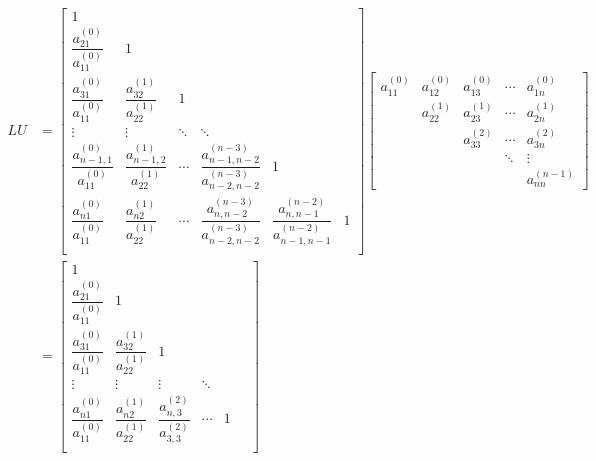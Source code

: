 \documentclass[UTF8,a4paper,10pt]{ctexart}
\begin{document}
                    \begin{align*}
                        LU&=
                        \begin{bmatrix}
                            1 & \  & \  & \  & \  & \  \\
                            \dfrac{a_{21}^{(0)}}{a_{11}^{(0)}} & 1 & \  & \  & \  & \  \\
                            \dfrac{a_{31}^{(0)}}{a_{11}^{(0)}} & \dfrac{a_{32}^{(1)}}{a_{22}^{(1)}} & 1 & \  & \  & \  \\
                            \vdots & \vdots & \ddots  & \ddots & \ \\
                            \dfrac{a_{n-1,1}^{(0)}}{a_{11}^{(0)}} & \dfrac{a_{n-1,2}^{(1)}}{a_{22}^{(1)}} & \cdots & \dfrac{a_{n-1,n-2}^{(n-3)}}{a_{n-2,n-2}^{(n-3)}} & 1 \\
                            \dfrac{a_{n1}^{(0)}}{a_{11}^{(0)}} & \dfrac{a_{n2}^{(1)}}{a_{22}^{(1)}} & \cdots & \dfrac{a_{n,n-2}^{(n-3)}}{a_{n-2,n-2}^{(n-3)}} & \dfrac{a_{n,n-1}^{(n-2)}}{a_{n-1,n-1}^{(n-2)}} & 1 \\
                        \end{bmatrix}
                        \begin{bmatrix}
                            a_{11}^{(0)} & a_{12}^{(0)} & a_{13}^{(0)} & \cdots & a_{1n}^{(0)} \\
                            \ & a_{22}^{(1)} & a_{23}^{(1)} & \cdots & a_{2n}^{(1)} \\
                            \ & \ & a_{33}^{(2)} & \cdots & a_{3n}^{(2)} \\
                            \ & \ & \ & \ddots & \vdots \\
                            \ & \ & \ & \ & a_{nn}^{(n-1)}
                        \end{bmatrix}\\
                        &=
                        \begin{bmatrix}
                            1 & \  & \  & \  & \  & \  \\
                            \dfrac{a_{21}^{(0)}}{a_{11}^{(0)}} & 1 & \  & \  & \  & \  \\
                            \dfrac{a_{31}^{(0)}}{a_{11}^{(0)}} & \dfrac{a_{32}^{(1)}}{a_{22}^{(1)}} & 1 & \  & \  & \  \\
                            \vdots & \vdots & \vdots  & \ddots & \ \\
                            \dfrac{a_{n1}^{(0)}}{a_{11}^{(0)}} & \dfrac{a_{n2}^{(1)}}{a_{22}^{(1)}} & \dfrac{a_{n,3}^{(2)}}{a_{3,3}^{(2)}} & \cdots & 1 \\

\end{bmatrix}
\end{align*}
\end{document}
